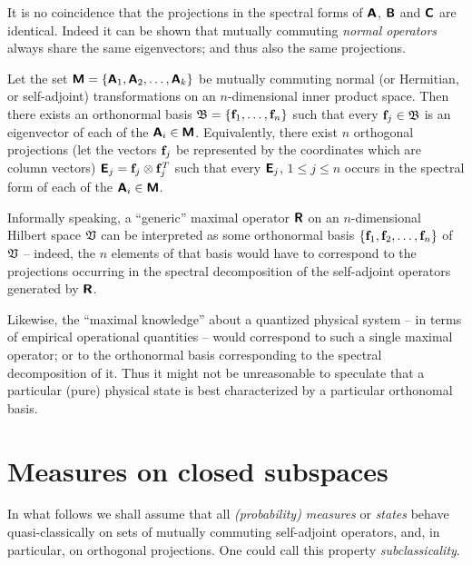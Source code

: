 It is no coincidence that the projections in the spectral forms of
$\textsf{\textbf{A}}$,
$\textsf{\textbf{B}}$  and
$\textsf{\textbf{C}}$ are identical.
Indeed it can be shown that mutually commuting {\em normal operators} always share the same eigenvectors; and thus also the same projections.

Let the set $\textsf{\textbf{M}}
=
\{
\textsf{\textbf{A}}_1,
\textsf{\textbf{A}}_2,
\ldots ,
\textsf{\textbf{A}}_k
\}
$
be mutually commuting  normal (or Hermitian, or self-adjoint) transformations on an $n$-dimensional inner product space.
Then there exists an orthonormal basis
${\frak B}= \{
{\bf f}_1,
\ldots ,
{\bf f}_n\}$
such that every ${\bf f}_j \in {\frak B}$  is an eigenvector  of each of the $\textsf{\textbf{A}}_i \in  \textsf{\textbf{M}}$.
Equivalently, there exist $n$ orthogonal projections  (let the vectors ${\bf f}_j$ be represented by the coordinates which are column vectors)
$\textsf{\textbf{E}}_j= {\bf f}_j\otimes {\bf f}_j^T$
such that every $\textsf{\textbf{E}}_j$, $1\le j\le n$ occurs in the spectral form of each of the $\textsf{\textbf{A}}_i \in  \textsf{\textbf{M}}$.


Informally speaking,
a ``generic'' maximal operator $\textsf{\textbf{R}}$ on an $n$-dimensional Hilbert space ${\frak V}$
can be interpreted as some orthonormal basis
$\{{\bf f}_1,{\bf f}_2,\ldots ,{\bf f}_n\}$ of ${\frak V}$
-- indeed, the $n$ elements of that basis would have to correspond to the projections occurring
in the spectral decomposition of the self-adjoint operators
generated by $\textsf{\textbf{R}}$.

{\color{Purple}
Likewise, the ``maximal knowledge'' about a quantized physical system -- in terms of empirical operational quantities --
would correspond to such a single maximal operator;
or to the orthonormal basis corresponding to the spectral decomposition of it.
Thus it might not be unreasonable to speculate that a particular (pure) physical state is best characterized by a particular orthonomal basis.
}


\section{Measures on closed subspaces}

In what follows we shall assume that all {\em (probability) measures}
or {\em states}
behave quasi-classically on sets of mutually commuting self-adjoint operators,
and, in particular, on orthogonal projections. One could call this property {\em subclassicality}.

